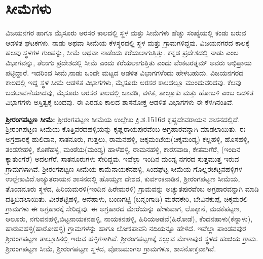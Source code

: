 \section*{ಸೀಮೆಗಳು}

ವಿಜಯನಗರ ಹಾಗೂ ಮೈಸೂರು ಅರಸರ ಕಾಲದಲ್ಲಿ ಸ್ಥಳ ಮತ್ತು ಸೀಮೆಗಳು ಹೆಚ್ಚು ಸಂಖ್ಯೆಯಲ್ಲಿ ಕಂಡು ಬರುವ ಆಡಳಿತ ಘಟಕಗಳು. ನಾಡು ಅಥವಾ ಸೀಮೆಯ ಕೆಳಸ್ಥರದಲ್ಲಿ ಸ್ಥಳ ಮತ್ತು ಗ್ರಾಮಗಳಿದ್ದವು. ವಿಜಯನಗರದ ಕಾಲಕ್ಕೆ ಹಲವು ಸ್ಥಳಗಳ ಗುಂಪನ್ನು, ಸೀಮೆ ಅಥವಾ ನಾಡೆಂದು ಕರೆಯಲಾಗುತ್ತಿತ್ತು. ಕನ್ನಡ ಪ್ರದೇಶದಲ್ಲಿ ನಾಡು ಎಂಬ ವಿಭಾಗವನ್ನು, ತೆಲುಗು ಪ್ರದೇಶದಲ್ಲಿ ಸೀಮೆ ಎಂದು ಕರೆಯಲಾಗುತ್ತಿತು ಎಂದು ವೆಂಕಟರತ್ನಮ್ ಅವರು ಅಭಿಪ್ರಾಯ ಪಟ್ಟಿದ್ದಾರೆ. ಇದರಿಂದ ಸೀಮೆ,ನಾಡು ಒಂದೇ ಮಟ್ಟದ ಆಡಳಿತ ವಿಭಾಗಗಳೆಂದು ಹೇಳಬಹುದು. ವಿಜಯನಗರದ ಕಾಲದಲ್ಲಿ ಇದ್ದ ಸ್ಥಳ ಸೀಮೆ ಆಡಳಿತ ವಿಭಾಗಗಳು, ಮೈಸೂರು ಅರಸರ ಕಾಲದಲ್ಲೂ ಮುಂದುವರಿದವು. ಕೆಲವು ಬದಲಾವಣೆಯಾದವು, ಮೈಸೂರು ಅರಸರ ಕಾಲದಲ್ಲಿ ಚಾವಡಿ, ವಳಿತ, ತಾಲ್ಲೂಕು ಮತ್ತು ಹೋಬಳಿ ಎಂಬ ಆಡಳಿತ ವಿಭಾಗಗಳು ಅಸ್ತಿತ್ವಕ್ಕೆ ಬಂದವು. ಈ ಎರಡೂ ಕಾಲದ ಶಾಸನೋಕ್ತ ಆಡಳಿತ ವಿಭಾಗಗಳು ಈ ಕೆಳಗಿನಂತಿವೆ.

\textbf{ಶ‍್ರೀರಂಗಪಟ್ಟಣ ಸೀಮೆ:} ಶ‍್ರೀರಂಗಪಟ್ಟಣ ಸೀಮೆಯ ಉಲ್ಲೇಖ ಕ್ರಿ.ಶ.1516ರ ಕೃಷ್ಣದೇವರಾಯನ ಶಾಸನದಲ್ಲಿದೆ. ಶ‍್ರೀರಂಗಪಟ್ಟಣ ಸೀಮೆಯ ಕೊತ್ತಿವರದಹಳ್ಳಿಯನ್ನು ಕೃಷ್ಣರಾಯಪುರವೆಂಬ ಅಗ್ರಹಾರವನ್ನಾಗಿ ಮಾಡಲಾಯಿತು. ಈ ಅಗ್ರಹಾರಕ್ಕೆ ಹುಲಿವಾನ, ಸಾತನೂರು, ಗುತ್ತಲು, ರಾಮನಹಳ್ಳಿ, ಚಿಕ್ಕಮಂಟೆಯ(ಚಿಕ್ಕಮಂಡ್ಯ) ಕಲ್ಲಹಳ್ಳಿ, ಹೊಸಹಳ್ಳಿ, ತಂಡಸೇಹಳ್ಳಿ, ಕೊಣೆಹಳ್ಳಿ, ಮಂಠೆಯ(ಮಂಡ್ಯ) ಹಾಳೆಹಳ್ಳಿ, ರಾಮನಹಳ್ಳಿ, ಕಾರಸವಾಡಿ, ಕೇತಮಗೆರೆ, (ಇಂದಿನ ಕ್ಯಾತುಂಗೆರೆ) ಅದಲಗೆರೆ, ಸಾತನೂರುಗಳು ಸೇರಿದ್ದವು. ಇವೆಲ್ಲಾ ಇಂದಿನ ಮಂಡ್ಯ ನಗರದ ಸುತ್ತಮುತ್ತ ಇರುವ ಗ್ರಾಮಗಳಾಗಿವೆ. ಶ‍್ರೀರಂಗಪಟ್ಟಣ ಸೀಮೆಯ ಕಾಮೆನಾಯಕನಹಳ್ಳಿ, ಸಿಂದಘಟ್ಟ ಸೀಮೆಯ ಗೊಲ್ಲರಚೆಟ್ಟನಹಳ್ಳಿಗಳ ಉಲ್ಲೇಖವಿದೆ.\break ಅಚ್ಯುತರಾಯನ ಶಾಸನದಲ್ಲಿ ಹೊಯ್ಸಣ ದೇಶದ, ಕುರ್ವಂಕನಾಡಿನ, ಶ‍್ರೀರಂಗಪಟ್ಟಣ ಸೀಮೆಯ, ತೊಂಡನೂರು ಸ್ಥಳದ, ಹಿರಿಯಮರಳಿ(ಇಂದಿನ ಹಿರೇಮರಳಿ) ಗ್ರಾಮವನ್ನು ಅಚ್ಯುತಪುರವೆಂಬ ಅಗ್ರಹಾರವನ್ನಾಗಿ ಮಾಡಿ ದತ್ತಿಬಿಡಲಾಯಿತು. ವೀರಶೆಟ್ಟಿಹಳ್ಳಿ, ಆನೆಹಾಳು, ಬಂಣಗಟ್ಟಿ (ಬನ್ನಂಗಾಡಿ) ಮಠದಕೇರಿ, ಬೇವಿನಕುಪ್ಪೆ, ಚಿಕ್ಕಮರಲಿ ಗ್ರಾಮಗಳು ಈ ಅಗ್ರಹಾರಕ್ಕೆ ಸೇರಿದ್ದವು. ಈ ಅಗ್ರಹಾರದ ಮೇರೆಯನ್ನು ಹೇಳುವಾಗ, ಲೊಕ್ಕಾನೆ, ಮಡಕೆಪಟ್ಟಣ, ಆಲೂರು, ನಗುವನಹಳ್ಳಿ,\break ಬಿಟ್ಟನಾಯಕನಹಳ್ಳಿ, ನಾಯಕನಹಳ್ಳಿ, ಹಿರಿಯಅಡವೆ(ಹಿರೋಡೆ), ಕೆಂದನಹಾಳು(ಕೆನ್ನಾಳು), ಹಾರುವಹಳ್ಳಿ(ಹಾರೋಹಳ್ಳಿ) ಗ್ರಾಮಗಳನ್ನು ಹಾಗೂ ಲೋಕಪಾವನಿ ನದಿಯನ್ನೂ ಹೇಳಿದೆ. ಇವೆಲ್ಲಾ ಪಾಂಡವಪುರ ಶ‍್ರೀರಂಗಪಟ್ಟಣ ತಾಲ್ಲೂಕಿನಲ್ಲಿ ಇರುವ ಹಳ್ಳಿಗಳಾಗಿವೆ. ಶ‍್ರೀರಂಗಪಟ್ಟಣಕ್ಕೆ ಸಲ್ಲುವ ಮೇಳಾಪುರ ಸ್ಥಳದ ಹಂಚಿಯ ಗ್ರಾಮ. ಶ‍್ರೀರಂಗಪಟ್ಟಣ ಸೀಮೆ, ಶ‍್ರೀರಂಗಪಟ್ಟಣ ಸ್ಥಳದ, ವೋಜಮಂಗಲ ಗ್ರಾಮಗಳೂ, ಶಾಸನೋಕ್ತವಾಗಿವೆ.

